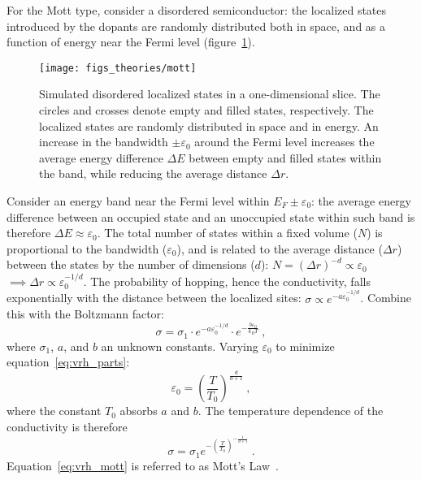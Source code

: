 For the Mott type, consider a disordered semiconductor: the localized states introduced by the dopants are randomly distributed both in space, and as a function of energy near the Fermi level (figure~\ref{fig:mott}). %
\begin{figure}[ht]%
    \centering%
    \texttt{[image: figs\_theories/mott]}%
    \caption[Simulated disordered localized states]{\label{fig:mott}Simulated disordered localized states in a one-dimensional slice. The circles and crosses denote empty and filled states, respectively. The localized states are randomly distributed in space and in energy. An increase in the bandwidth $\pm\varepsilon_0$ around the Fermi level increases the average energy difference $\Delta E$ between empty and filled states within the band, while reducing the average distance $\Delta r$.}%
\end{figure}%
%
Consider an energy band near the Fermi level within $E_F \pm \varepsilon_0$: the average energy difference between an occupied state and an unoccupied state within such band is therefore $\Delta E \approx \varepsilon_0$. The total number of states within a fixed volume ($N$) is proportional to the bandwidth ($\varepsilon_0$), and is related to the average distance ($\Delta r$) between the states by the number of dimensions ($d$): $N = (\Delta r)^{-d} \propto \varepsilon_0$ $\implies \Delta r \propto \varepsilon_0^{-1/d}$. The probability of hopping, hence the conductivity, falls exponentially with the distance between the localized sites: $\sigma \propto e^{-a\varepsilon_0^{-1/d}}$. Combine this with the Boltzmann factor:%
\begin{equation}%
    \sigma = \sigma_1 \cdot e^{-a\varepsilon_0^{-1/d}} \cdot e^{-\frac{b\varepsilon_0}{k_B T}}~,\label{eq:vrh_parts}%
\end{equation}%
where $\sigma_1$, $a$, and $b$ an unknown constants. Varying $\varepsilon_0$ to minimize equation~\ref{eq:vrh_parts}:%
\begin{equation}%
    \varepsilon_0 = \left(\frac{T}{T_0}\right)^{\frac{d}{d+1}}~,%
\end{equation}%
where the constant $T_0$ absorbs $a$ and $b$. The temperature dependence of the conductivity is therefore%
\begin{equation}%
    \sigma = \sigma_1 e^{-\left(\frac{T}{T_0}\right)^{-\frac{1}{d+1}}}~.\label{eq:vrh_mott}%
\end{equation}%
Equation~\ref{eq:vrh_mott} is referred to as Mott's Law~\cite{schklovskii_efros, mott1968}.

